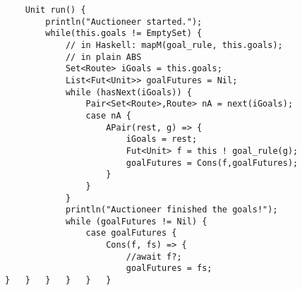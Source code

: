 \documentclass[runningheads,a4paper]{llncs}
\begin{document}
\begin{lstlisting}
	Unit run() {
		println("Auctioneer started.");
		while(this.goals != EmptySet) {
			// in Haskell: mapM(goal_rule, this.goals);
			// in plain ABS
			Set<Route> iGoals = this.goals;
			List<Fut<Unit>> goalFutures = Nil;
			while (hasNext(iGoals)) {
				Pair<Set<Route>,Route> nA = next(iGoals);
				case nA {
					APair(rest, g) => {
						iGoals = rest;
						Fut<Unit> f = this ! goal_rule(g);
						goalFutures = Cons(f,goalFutures);
					}
				}
			}
			println("Auctioneer finished the goals!");
			while (goalFutures != Nil) {
				case goalFutures {
					Cons(f, fs) => {
						//await f?;
						goalFutures = fs;
}	}	}	}	}	}
\end{lstlisting}	
\end{document}
